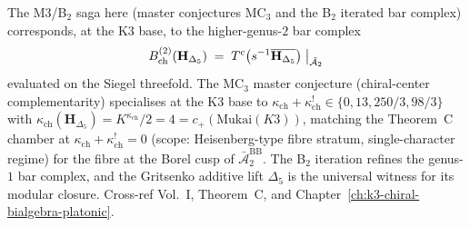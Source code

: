 \begin{remark}
\label{rem:m3b2-k3-base-correspondence}
The M3/B$_2$ saga here (master conjectures MC$_3$ and the B$_2$
iterated bar complex) corresponds, at the K3 base, to the
higher-genus-$2$ bar complex
\[
B^{(2)}_{\mathrm{ch}}(\mathbf H_{\Delta_5}) \;=\; T^c\bigl(s^{-1}\overline{\mathbf H_{\Delta_5}}\bigr)\bigm|_{\bar{\mathcal A}_2}
\]
evaluated on the Siegel threefold. The MC$_3$ master conjecture
(chiral-center complementarity) specialises at the K3 base to
$\kappa_{\mathrm{ch}} + \kappa_{\mathrm{ch}}^! \in \{0, 13, 250/3, 98/3\}$ with $\kappa_{\mathrm{ch}}(\mathbf H_{\Delta_5}) = K^{\kappa_{\mathrm{ch}}}/2 = 4 = c_+(\mathrm{Mukai}(K3))$,
matching the Theorem~C chamber at $\kappa_{\mathrm{ch}} + \kappa_{\mathrm{ch}}^! = 0$ (scope: Heisenberg-type
fibre stratum, single-character regime) for the fibre at the Borel cusp of $\bar{\mathcal A}_2^{\mathrm{BB}}$.
The B$_2$ iteration refines the genus-$1$ bar
complex, and the Gritsenko additive lift $\Delta_5$ is the universal
witness for its modular closure. Cross-ref Vol.~I, Theorem~C, and
Chapter~\ref{ch:k3-chiral-bialgebra-platonic}.
\end{remark}

